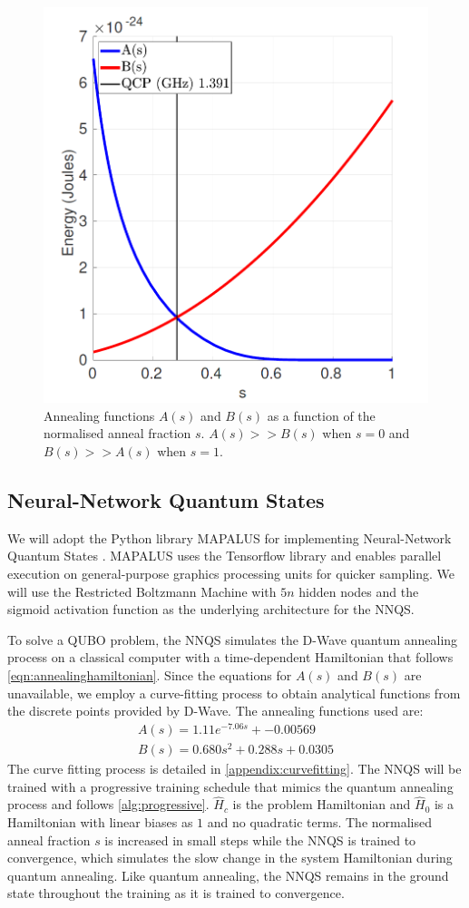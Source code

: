 \begin{figure}[htb!]
    \centering
    \includegraphics[width=0.5\linewidth]{images/dwave_annealing.png}
    \caption[Annealing functions $A(s)$ and $B(s)$ as a function of the normalised anneal fraction $s$. $A(s) >> B(s)$ when $s=0$ and $B(s) >> A(s)$ when $s=1$.]{Annealing functions $A(s)$ and $B(s)$ as a function of the normalised anneal fraction $s$. $A(s) >> B(s)$ when $s=0$ and $B(s) >> A(s)$ when $s=1$. ~\protect\cite{dwaveadvantage}}
    \label{dwaveannealing}
\end{figure}

\subsection{Neural-Network Quantum States}
We will adopt the Python library MAPALUS for implementing Neural-Network Quantum States \cite{b25}. MAPALUS uses the Tensorflow library and enables parallel execution on general-purpose graphics processing units for quicker sampling. We will use the Restricted Boltzmann Machine with $5n$ hidden nodes and the sigmoid activation function as the underlying architecture for the NNQS.

To solve a QUBO problem, the NNQS simulates the D-Wave quantum annealing process on a classical computer with a time-dependent Hamiltonian that follows \autoref{eqn:annealinghamiltonian}. Since the equations for $A(s)$ and $B(s)$ are unavailable, we employ a curve-fitting process to obtain analytical functions from the discrete points provided by D-Wave. The annealing functions used are:
\begin{gather}
    A(s) = 1.11e^{-7.06s} + -0.00569 \\
    B(s)= 0.680s^2 + 0.288s + 0.0305
    \label{fittedeq}
\end{gather}
The curve fitting process is detailed in \autoref{appendix:curvefitting}. The NNQS will be trained with a progressive training schedule that mimics the quantum annealing process and follows \autoref{alg:progressive}. $\hat{H}_c$ is the problem Hamiltonian and $\hat{H}_0$ is a Hamiltonian with linear biases as $1$ and no quadratic terms. The normalised anneal fraction $s$ is increased in small steps while the NNQS is trained to convergence, which simulates the slow change in the system Hamiltonian during quantum annealing. Like quantum annealing, the NNQS remains in the ground state throughout the training as it is trained to convergence.

